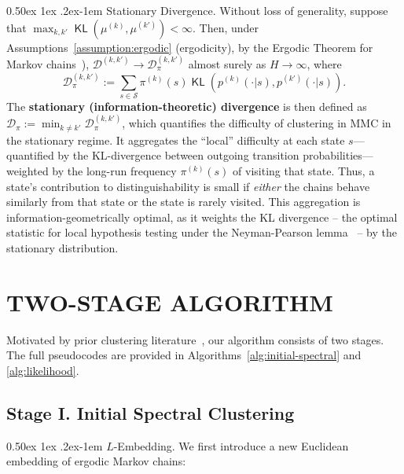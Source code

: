 \documentclass[twoside]{article}
\makeatletter
\renewcommand{\paragraph}{%
  \@startsection{paragraph}{4}%
  {\z@}{0.50ex \@plus 1ex \@minus .2ex}{-1em}%
  {\normalfont\normalsize\bfseries}%
}
\DeclareMathOperator{\KL}{{\mathsf{KL}}}
\def\gD{{\mathcal{D}}}
\def\gS{{\mathcal{S}}}
\theoremstyle{plain}
\makeatother
\begin{document}
\paragraph{Stationary Divergence.}
Without loss of generality, suppose that $\max_{k,k'} \KL(\mu^{(k)}, \mu^{(k')}) < \infty$.
Then, under Assumptions~\ref{assumption:ergodic} (ergodicity), by the Ergodic Theorem for Markov chains~\citep[Appendix C]{markovmixing}), $\gD^{(k,k')} \rightarrow \gD_\pi^{(k,k')}$ almost surely as $H \rightarrow \infty$, where
\begin{equation}
\label{eqn:D-pi}
    \gD_\pi^{(k,k')} := \sum_{s \in \gS} \pi^{(k)}(s) \KL\left( p^{(k)}(\cdot | s), p^{(k')}(\cdot | s) \right).
\end{equation}
The \textbf{stationary (information-theoretic) divergence} is then defined as $\gD_\pi := \min_{k \neq k'} \gD_\pi^{(k,k')}$, which quantifies the difficulty of clustering in MMC in the stationary regime.
It aggregates the ``local'' difficulty at each state $s$—quantified by the KL-divergence between outgoing transition probabilities—weighted by the long-run frequency $\pi^{(k)}(s)$ of visiting that state.
Thus, a state's contribution to distinguishability is small if \emph{either} the chains behave similarly from that state or the state is rarely visited.
This aggregation is information-geometrically optimal, as it weights the KL divergence -- the optimal statistic for local hypothesis testing under the Neyman-Pearson lemma~\citep{neyman-pearson} -- by the stationary distribution.


\section{TWO-STAGE ALGORITHM}
\label{sec:upperbound}

Motivated by prior clustering literature~\citep{gao2017sbm,yun2016labeled,lu2016gmm}, our algorithm consists of two stages.
The full pseudocodes are provided in Algorithms~\ref{alg:initial-spectral} and \ref{alg:likelihood}.



\subsection{Stage I. Initial Spectral Clustering}
\label{sec:spectral}

\paragraph{$L$-Embedding.}
We first introduce a new Euclidean embedding of ergodic Markov chains:
\end{document}
